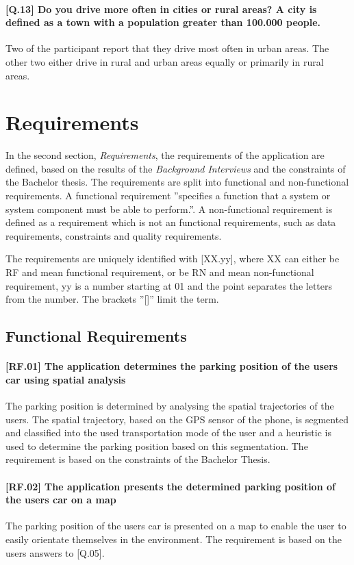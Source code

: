 \paragraph{[Q.13] Do you drive more often in cities or rural areas? A city is defined as a town with a population greater than 100.000 people.}
Two of the participant report that they drive most often in urban areas. The other two either drive in rural and urban areas equally or primarily in rural areas.


\section{Requirements}
In the second section, \textit{Requirements}, the requirements of the application are defined, based on the results of the \textit{Background Interviews} and the constraints of the Bachelor thesis. The requirements are split into functional and non-functional requirements. A functional requirement ''specifies a function that a system or system component must be able to perform.''. A non-functional requirement is defined as a requirement which is not an functional requirements, such as data requirements, constraints and quality requirements. \cite{eide2005quantification}

The requirements are uniquely identified with [XX.yy], where XX can either be RF and mean functional requirement, or be RN and mean non-functional requirement, yy is a number starting at 01 and the point separates the letters from the number. The brackets ''[]'' limit the term.  

\subsection{Functional Requirements}

\paragraph{[RF.01] The application determines the parking position of the users car using spatial analysis}
The parking position is determined by analysing the spatial trajectories of the users. The spatial trajectory, based on the GPS sensor of the phone, is segmented and classified into the used transportation mode of the user and a heuristic is used to determine the parking position based on this segmentation. The requirement is based on the constraints of the Bachelor Thesis. 

\paragraph{[RF.02] The application presents the determined parking position of the users car on a map}
The parking position of the users car is presented on a map to enable the user to easily orientate themselves in the environment. The requirement is based on the users answers to [Q.05].

